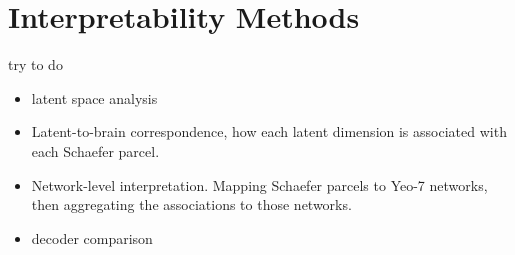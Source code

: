 \section{Interpretability Methods}

try to do
\begin{itemize}
    \item latent space analysis
    \item Latent-to-brain correspondence, how each latent dimension is associated with each Schaefer parcel.
    \item Network-level interpretation. Mapping Schaefer parcels to Yeo-7 networks, then aggregating the associations to those networks.
    \item decoder comparison
\end{itemize}